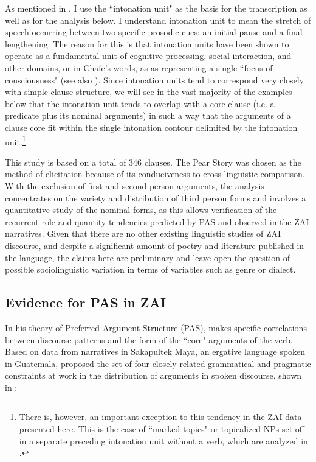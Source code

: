 As mentioned in , I use the ``intonation unit" \citep{chafe1994} as the basis for the transcription as well as for the analysis below. I understand intonation unit to mean the stretch of speech occurring between two specific prosodic cues: an initial pause and a final lengthening. The reason for this is that intonation units have been shown to operate as a fundamental unit of cognitive processing, social interaction, and other domains, or in Chafe's words, as as representing a single ``focus of consciousness" (see also \citealt{dubois1993}). Since intonation units tend to correspond very closely with simple clause structure, we will see in the vast majority of the examples below that the intonation unit tends to overlap with a core clause (i.e. a predicate plus its nominal arguments) in such a way that the arguments of a clause core fit within the single intonation contour delimited by the intonation unit.\footnote{There is, however, an important exception to this tendency in the ZAI data presented here. This is the case of ``marked topics" or topicalized NPs set off in a separate preceding intonation unit without a verb, which are analyzed in .}

This study is based on a total of 346 clauses. The Pear Story was chosen as the method of elicitation because of its conduciveness to cross-linguistic comparison. With the exclusion of first and second person arguments, the analysis concentrates on the variety and distribution of third person forms and involves a quantitative study of the nominal forms, as this allows verification of the recurrent role and quantity tendencies predicted by PAS and observed in the ZAI narratives. Given that there are no other existing linguistic studies of ZAI discourse, and despite a significant amount of poetry and literature published in the language, the claims here are preliminary and leave open the question of possible sociolinguistic variation in terms of variables such as genre or dialect.


\subsection{Evidence for PAS in ZAI}\label{evidenceforpas}

In his theory of Preferred Argument Structure (PAS), \citet{dubois1987,dubois2003a,dubois2003b} makes specific correlations between discourse patterns and the form of the ``core" arguments of the verb. Based on data from narratives in Sakapultek Maya, an ergative language spoken in Guatemala, \citet{dubois1987} proposed the set of four closely related grammatical and pragmatic constraints at work in the distribution of arguments in spoken discourse, shown in :

